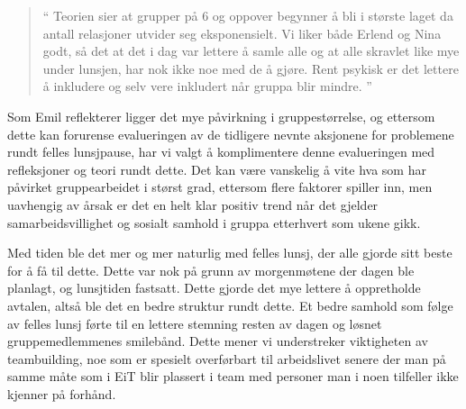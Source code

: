 \begin{quote}``
Teorien sier at grupper på 6 og oppover begynner å bli i største laget da antall relasjoner utvider seg eksponensielt. Vi liker både Erlend og Nina godt, så det at det i dag var lettere å samle alle og at alle skravlet like mye under lunsjen, har nok ikke noe med de å gjøre. Rent psykisk er det lettere å inkludere og selv vere inkludert når gruppa blir mindre.
''\end{quote} 

Som Emil reflekterer ligger det mye påvirkning i gruppestørrelse, og ettersom dette kan forurense evalueringen av de tidligere nevnte aksjonene for problemene rundt felles lunsjpause, har vi valgt å komplimentere denne evalueringen med refleksjoner og teori rundt dette. Det kan være vanskelig å vite hva som har påvirket gruppearbeidet i størst grad, ettersom flere faktorer spiller inn, men uavhengig av årsak er det en helt klar positiv trend når det gjelder samarbeidsvillighet og sosialt samhold i gruppa etterhvert som ukene gikk.

Med tiden ble det mer og mer naturlig med felles lunsj, der alle gjorde sitt beste for å få til dette. Dette var nok på grunn av morgenmøtene der dagen ble planlagt, og lunsjtiden fastsatt. Dette gjorde det mye lettere å oppretholde avtalen, altså ble det en bedre struktur rundt dette. Et bedre samhold som følge av felles lunsj førte til en lettere stemning resten av dagen og løsnet gruppemedlemmenes smilebånd. Dette mener vi understreker viktigheten av teambuilding, noe som er spesielt overførbart til arbeidslivet senere der man på samme måte som i EiT blir plassert i team med personer man i noen tilfeller ikke kjenner på forhånd. 

